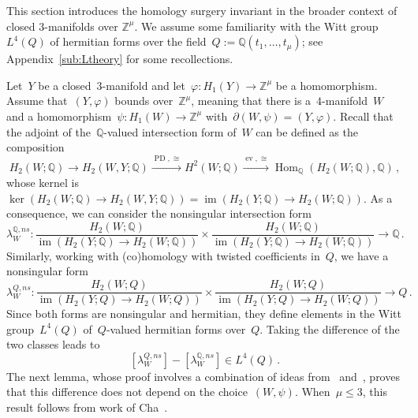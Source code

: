 \documentclass[10.9pt,a4paper]{amsart}
\theoremstyle{definition}
\theoremstyle{remark}
\newcommand{\Z}{\mathbb{Z}}
\newcommand{\Q}{\mathbb{Q}}
\newcommand{\ev}{\operatorname{ev}}
\newcommand{\PD}{\operatorname{PD}}
\newcommand{\im}{\operatorname{im}}
\newcommand{\Hom}{\operatorname{Hom}}
\begin{document}
This section introduces the homology surgery invariant in the broader context of closed $3$-manifolds over $\Z^\mu$.
We assume some familiarity with the Witt group $L^4(Q)$ of hermitian forms over the field~$Q:=\Q(t_1,\ldots,t_\mu)$; see Appendix~\ref{sub:Ltheory} for some recollections.

\medbreak

Let~$Y$ be a closed~$3$-manifold and let~$\varphi \colon H_1(Y) \to \Z^\mu$ be a homomorphism.
Assume that~$(Y,\varphi)$ bounds over~$\Z^\mu$,  meaning that there is a~$4$-manifold~$W$ and a homomorphism~$\psi \colon H_1(W) \to \Z^\mu$ with~$\partial (W,\psi)=(Y,\varphi)$.
Recall that the adjoint of the~$\Q$-valued intersection form of~$W$ can be defined as the composition
\[
H_2(W;\Q)\to H_2(W,Y;\Q)\xrightarrow{\PD,\cong} H^2(W;\Q)\xrightarrow{\ev,\cong}\Hom_\Q(H_2(W;\Q),\Q)\,,
\]
whose kernel is~$\ker(H_2(W;\Q)\to H_2(W,Y;\Q))=\im(H_2(Y;\Q) \to H_2(W;\Q))$. As a consequence, we can consider the nonsingular intersection form
\[
\lambda_W^{\Q,\textit{ns}} \colon \frac{H_2(W;\Q)}
{\im(H_2(Y;\Q) \to H_2(W;\Q))} \times 
\frac{H_2(W;\Q)}
{\im(H_2(Y;\Q) \to H_2(W;\Q))} 
\to \Q\,.
\]
Similarly, working with (co)homology with twisted coefficients in~$Q$, we have a nonsingular form
\[
\lambda_W^{Q,\textit{ns}} \colon \frac{H_2(W;Q)}
{\im(H_2(Y;Q) \to H_2(W;Q))} \times 
\frac{H_2(W;Q)}
{\im(H_2(Y;Q) \to H_2(W;Q))} 
\to Q\,.
\]
Since both forms are nonsingular and hermitian, they define elements in the Witt group~$L^4(Q)$ of~$Q$-valued hermitian forms over~$Q$.
Taking the difference of the two classes leads  to
$$ 
[\lambda_W^{Q,\textit{ns}}]-[\lambda_W^{\Q,\textit{ns}}] \in L^4(Q)\,.
$$
The next lemma, whose proof involves a combination of ideas from~\cite[Lemma 2.3]{ChaHirzebruch} and~\cite[Corollary~2.11]{ConwayNagelToffoli},  proves that this difference does not depend on the choice~$(W,\psi)$.
When~$\mu \leq 3$, this result follows from work of Cha~\cite[Lemma 2.3]{ChaHirzebruch}.
\end{document}
